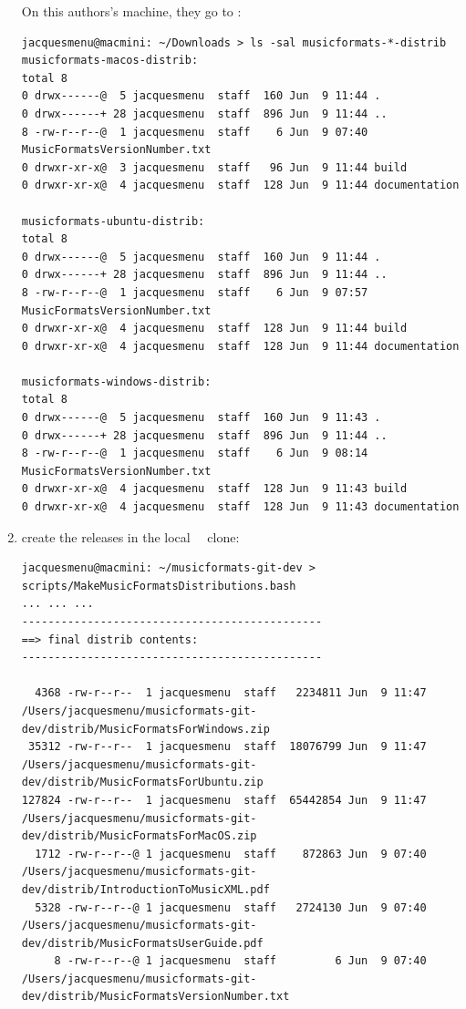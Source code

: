\begin{enumerate}
On this authors's machine, they go to :
\begin{lstlisting}[language=Terminal]
jacquesmenu@macmini: ~/Downloads > ls -sal musicformats-*-distrib
musicformats-macos-distrib:
total 8
0 drwx------@  5 jacquesmenu  staff  160 Jun  9 11:44 .
0 drwx------+ 28 jacquesmenu  staff  896 Jun  9 11:44 ..
8 -rw-r--r--@  1 jacquesmenu  staff    6 Jun  9 07:40 MusicFormatsVersionNumber.txt
0 drwxr-xr-x@  3 jacquesmenu  staff   96 Jun  9 11:44 build
0 drwxr-xr-x@  4 jacquesmenu  staff  128 Jun  9 11:44 documentation

musicformats-ubuntu-distrib:
total 8
0 drwx------@  5 jacquesmenu  staff  160 Jun  9 11:44 .
0 drwx------+ 28 jacquesmenu  staff  896 Jun  9 11:44 ..
8 -rw-r--r--@  1 jacquesmenu  staff    6 Jun  9 07:57 MusicFormatsVersionNumber.txt
0 drwxr-xr-x@  4 jacquesmenu  staff  128 Jun  9 11:44 build
0 drwxr-xr-x@  4 jacquesmenu  staff  128 Jun  9 11:44 documentation

musicformats-windows-distrib:
total 8
0 drwx------@  5 jacquesmenu  staff  160 Jun  9 11:43 .
0 drwx------+ 28 jacquesmenu  staff  896 Jun  9 11:44 ..
8 -rw-r--r--@  1 jacquesmenu  staff    6 Jun  9 08:14 MusicFormatsVersionNumber.txt
0 drwxr-xr-x@  4 jacquesmenu  staff  128 Jun  9 11:43 build
0 drwxr-xr-x@  4 jacquesmenu  staff  128 Jun  9 11:43 documentation
\end{lstlisting}


\item create the releases in the local \mf\ \repo\ clone:
\begin{lstlisting}[language=TerminalSmall]
jacquesmenu@macmini: ~/musicformats-git-dev > scripts/MakeMusicFormatsDistributions.bash
... ... ...
----------------------------------------------
==> final distrib contents:
----------------------------------------------

  4368 -rw-r--r--  1 jacquesmenu  staff   2234811 Jun  9 11:47 /Users/jacquesmenu/musicformats-git-dev/distrib/MusicFormatsForWindows.zip
 35312 -rw-r--r--  1 jacquesmenu  staff  18076799 Jun  9 11:47 /Users/jacquesmenu/musicformats-git-dev/distrib/MusicFormatsForUbuntu.zip
127824 -rw-r--r--  1 jacquesmenu  staff  65442854 Jun  9 11:47 /Users/jacquesmenu/musicformats-git-dev/distrib/MusicFormatsForMacOS.zip
  1712 -rw-r--r--@ 1 jacquesmenu  staff    872863 Jun  9 07:40 /Users/jacquesmenu/musicformats-git-dev/distrib/IntroductionToMusicXML.pdf
  5328 -rw-r--r--@ 1 jacquesmenu  staff   2724130 Jun  9 07:40 /Users/jacquesmenu/musicformats-git-dev/distrib/MusicFormatsUserGuide.pdf
     8 -rw-r--r--@ 1 jacquesmenu  staff         6 Jun  9 07:40 /Users/jacquesmenu/musicformats-git-dev/distrib/MusicFormatsVersionNumber.txt


\end{lstlisting}
\end{enumerate}
